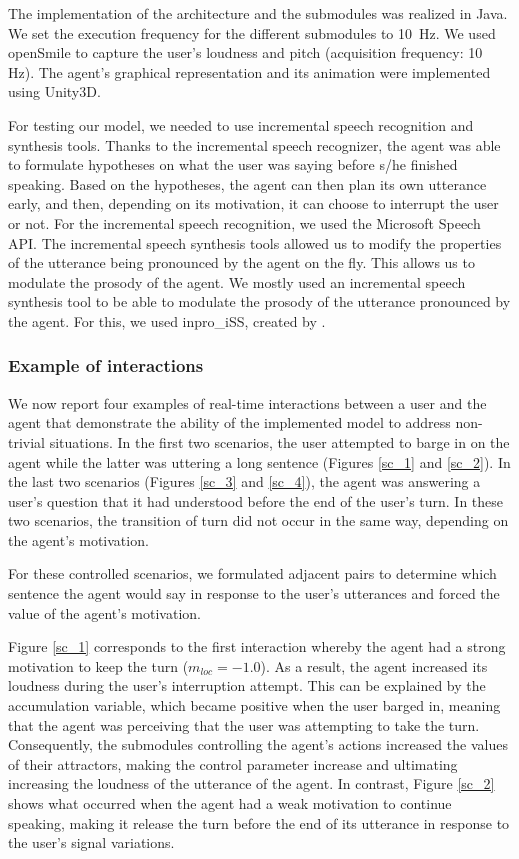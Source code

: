 \documentclass[twocolumn]{svjour3}
\begin{document}
The implementation of the architecture and the submodules was realized in Java. We set the execution frequency for the different submodules to 10~Hz. 
We used openSmile \citep{eyben_recent_2013} to capture the user's loudness and pitch (acquisition frequency: 10 Hz). %
The agent's graphical representation and its animation were implemented using Unity3D. 

For testing our model, we needed to use incremental speech recognition and synthesis tools. Thanks to the incremental speech recognizer, the agent was able to formulate hypotheses on what the user was saying before s/he  finished speaking. Based on the hypotheses, the agent can then plan its own utterance early, and then, depending on its motivation, it can choose to interrupt the user or not. For the incremental speech recognition, we used the Microsoft Speech API. 
The incremental speech synthesis tools allowed us to modify  the properties of the utterance being pronounced by the agent on the fly. This allows us to modulate the prosody of the agent. We mostly used an incremental speech synthesis tool to be able to modulate the prosody of the utterance pronounced by the agent. For this, we used inpro\_iSS, created by \cite{baumann_inpro_2012}. 

\subsubsection{Example of interactions}

We now report four examples of real-time interactions between a user and the agent that demonstrate the ability of the implemented model to address non-trivial situations. In the first two scenarios, the user attempted to barge in on the agent while the latter was uttering a long sentence (Figures \ref{sc_1} and \ref{sc_2}). In the last two scenarios (Figures \ref{sc_3} and \ref{sc_4}), the agent was answering a user's question that it had understood before the end of the user's turn. In these two scenarios, the transition of turn did not occur in the same way, depending on the agent's motivation. 

For these controlled scenarios, we formulated adjacent pairs to determine which sentence the agent would say in response to the user's utterances and forced the value of the agent's motivation. 

Figure \ref{sc_1} corresponds to the first interaction whereby the agent had a strong motivation to keep the turn ($m_{loc}=-1.0$). 
As a result, the agent increased its loudness during the user's interruption attempt. This can be explained by the accumulation variable, which became positive when the user barged in, meaning that the agent was perceiving that the user was attempting to take the turn. 
Consequently, the submodules controlling the agent's actions increased the values of their attractors, making the control parameter increase and ultimating increasing the loudness of the utterance of the agent. 
In contrast, Figure \ref{sc_2} shows what occurred when the agent had a weak motivation to continue speaking, making it release the turn before the end of its utterance in response to the user's signal variations.
\end{document}
